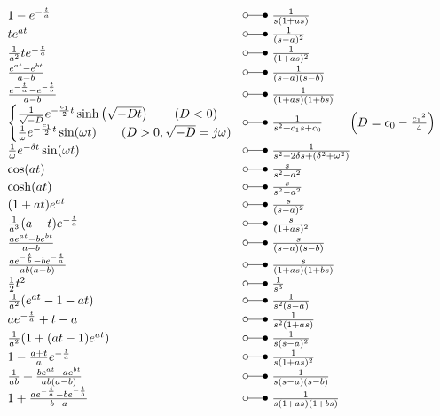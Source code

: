 \[ \begin{array}{@{}l@{ ~ \laplace ~ }l@{}}
1 - e^{-\frac{t}{a}} &
    \frac{1}{s (1 + as)} \\
t e^{at} &
    \frac{1}{(s - a)^2} \\
\frac{1}{a^2} t e^{-\frac{t}{a}} &
    \frac{1}{(1 + as)^2} \\
\frac{e^{at} - e^{bt}}{a - b} &
    \frac{1}{(s - a) (s - b)} \\
\frac{e^{-\frac{t}{a}} - e^{-\frac{t}{b}}}{a - b} &
    \frac{1}{(1 + as) (1 + bs)} \\
\left\lbrace\begin{array}{@{}l}
\frac{1}{\sqrt{-D}} e^{-\frac{c_1}{2}t} \sinh\left(\sqrt{-Dt}\right) \qquad (D < 0) \\
\frac{1}{\omega} e^{-\frac{c_1}{2}t} \sin(\omega t)                  \qquad (D > 0, \sqrt{-D} = j \omega)
\end{array}\right. &
    \frac{1}{s^2 + c_1 s + c_0} \qquad \left(D = c_0 - \frac{{c_1}^2}{4}\right) \\
\frac{1}{\omega} e^{-\delta t} \sin(\omega t) &
    \frac{1}{s^2 + 2 \delta s + (\delta^2 + \omega^2)} \\
\cos(a t) &
    \frac{s}{s^2 + a^2} \\
\cosh(a t) &
    \frac{s}{s^2 - a^2} \\
(1 + a t) e^{a t} &
    \frac{s}{(s - a)^2} \\
\frac{1}{a^3} (a - t) e^{-\frac{t}{a}} &
    \frac{s}{(1 + as)^2} \\
\frac{a e^{a t} - b e^{b t}}{a - b} &
    \frac{s}{(s - a) (s - b)} \\
\frac{a e^{-\frac{t}{b}} - b e^{-\frac{t}{a}}}{a b (a - b)} &
    \frac{s}{(1 + as) (1 + bs)} \\
\frac{1}{2} t^2 &
    \frac{1}{s^3} \\
\frac{1}{a^2} (e^{at} - 1 - at) &
    \frac{1}{s^2 (s - a)} \\
a e^{-\frac{t}{a}} + t - a &
    \frac{1}{s^2 (1 + a s)} \\
\frac{1}{a^2} (1 + (a t - 1) e^{a t}) &
    \frac{1}{s (s - a)^2} \\
1 - \frac{a + t}{a} e^{-\frac{t}{a}} &
    \frac{1}{s (1 + as)^2} \\
\frac{1}{ab} + \frac{b e^{at} - a e^{bt}}{ab (a - b)} &
    \frac{1}{s (s - a) (s - b)} \\
1 + \frac{a e^{-\frac{t}{a}} - b e^{-\frac{t}{b}}}{b - a} &
    \frac{1}{s (1 + as) (1 + bs)} \\
\end{array} \]

